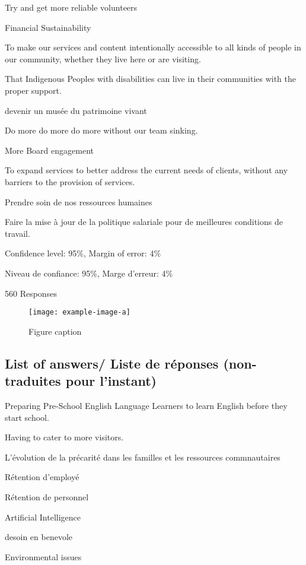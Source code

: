 Try and get more reliable volunteers

Financial Sustainability

To make our services and content intentionally accessible to all kinds of people in our community, whether they live here or are
visiting.

That Indigenous Peoples with disabilities can live in their communities with the proper support.

devenir un musée du patrimoine vivant

Do more do more do more without our team sinking.

More Board engagement

To expand services to better address the current needs of clients, without any barriers to the provision of services.

Prendre soin de nos ressources humaines

Faire la mise à jour de la politique salariale pour de meilleures conditions de travail.


\hfill
Confidence level: 95\%, Margin of error: 4\%

\hfill
Niveau de confiance: 95\%, Marge d'erreur: 4\%
\bigskip

\hfill
560 Responses

\begin{figure}[htb]\centering
  \texttt{[image: example-image-a]}
\caption{Figure caption}
\label{f1}
\end{figure}

\subsection{List of answers/ Liste de réponses (non-traduites pour l'instant)}

Preparing Pre-School English Language Learners to learn English before they start school.

Having to cater to more visitors.

L'évolution de la précarité dans les familles et les ressources commnautaires

Rétention d'employé

Rétention de personnel

Artificial Intelligence

desoin en benevole

Environmental issues
